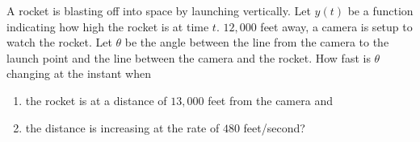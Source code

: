 \documentclass[12pt, a4paper]{article}
\begin{document}
\begin{ex}
  A rocket is blasting off into space by launching
  vertically. Let \(y(t)\) be a function indicating how high the
  rocket is at time \(t\). \(12,000\) feet away, a camera is setup to
  watch the 
  rocket. Let \(\theta\) be the angle between the line from the camera
  to the launch point and the line between the camera and the rocket.
  How fast is \(\theta\) changing at the instant when  
  \begin{enumerate}
  \item the rocket is at a distance of \(13,000\) feet from the camera
    and
  \item the distance is increasing at the rate of \(480\) feet/second?
  \end{enumerate}

\end{ex}
\end{document}
